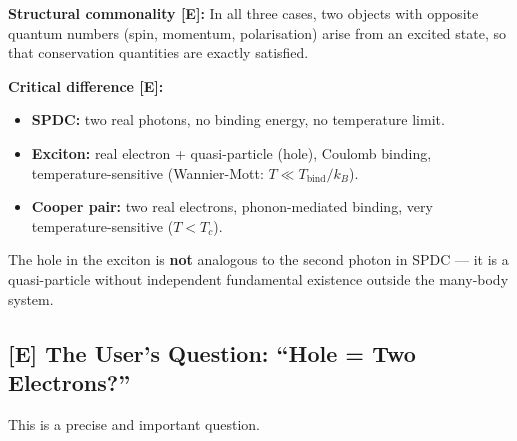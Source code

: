 \begin{center}
\end{center}

\textbf{Structural commonality [E]:}
In all three cases, two objects with opposite quantum numbers
(spin, momentum, polarisation) arise from an excited state,
so that conservation quantities are exactly satisfied.

\textbf{Critical difference [E]:}
\begin{itemize}
  \item \textbf{SPDC:} two real photons, no binding energy,
    no temperature limit.
  \item \textbf{Exciton:} real electron + quasi-particle (hole),
    Coulomb binding, temperature-sensitive (Wannier-Mott: $T \ll T_\text{bind}/k_B$).
  \item \textbf{Cooper pair:} two real electrons, phonon-mediated
    binding, very temperature-sensitive ($T < T_c$).
\end{itemize}

The hole in the exciton is \textbf{not} analogous to the second photon
in SPDC --- it is a quasi-particle without independent
fundamental existence outside the many-body system.

\subsection{[E] The User's Question: ``Hole = Two Electrons?''}

This is a precise and important question.

